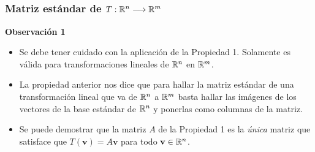 
\subsection{}

\begin{frame}\frametitle{Matriz estándar de $T:\mathbb{R}^n\longrightarrow\mathbb{R}^m$}
	
	\begin{alertblock}{\textbf{Observación 1 }}
		
		\begin{itemize}
			\justifying
			\item[\labelname{$a$}] Se debe tener cuidado con la aplicación de la Propiedad 1. Solamente es válida para transformaciones lineales de $\mathbb{R}^n$ en $\mathbb{R}^m$.
			\item[\labelname{$b$}] La propiedad anterior nos dice que para hallar la matriz estándar de una transformación lineal que va de $\mathbb{R}^n$ a $\mathbb{R}^m$ basta hallar las imágenes de los vectores de la base estándar de $\mathbb{R}^n$ y ponerlas como columnas de la matriz.
			\item[\labelname{$c$}] Se puede demostrar que la matriz $A$ de la Propiedad 1 es la \textit{única} matriz que satisface que $T(\mathbf{v})=A\mathbf{v}$ para todo $\mathbf{v}\in\mathbb{R}^n$.
		\end{itemize}
		
	\end{alertblock}
	

	
\end{frame}


\subsection{}

